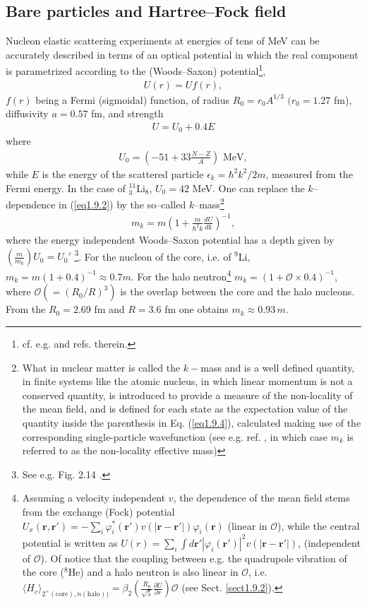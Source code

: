 \subsection{Bare particles and Hartree--Fock field}
Nucleon elastic scattering experiments at energies of tens of MeV can be accurately described in terms of an optical potential in which the real component is parametrized according to the (Woods--Saxon) potential\footnote{cf. e.g. \cite{Bohr:69} and refs. therein.},
\begin{align}
U(r)=Uf(r),
\end{align}
$f(r)$ being a Fermi (sigmoidal) function, of radius $R_0=r_0A^{1/3}$ $(r_0=1.27$ fm), diffusivity $a=0.57$ fm, and strength 
\begin{align}\label{eq1.9.2}
U=U_0+0.4 E
\end{align}
where 
\begin{align}\label{eq1.9.3}
U_0=\left(-51+33\frac{N-Z}{A}\right)\text{ MeV},
\end{align}
while $E$ is the energy of the scattered particle $\epsilon_k=\hbar^2k^2/2m$, measured from the Fermi energy. In the case of $^{11}_3$Li$_8$, $U_0=42$ MeV. One can replace the $k$--dependence in (\ref{eq1.9.2}) by the so--called $k$--mass\footnote{What in nuclear matter is called the $k-$mass  and is a well defined quantity, in finite systems like the atomic nucleus, in which linear momentum is not
a conserved quantity,  is introduced to provide a measure of the non-locality of the mean field, and is defined for each state 
as the expectation value of the quantity inside the parenthesis in Eq. (\ref{eq1.9.4}), calculated making use of the corresponding single-particle wavefunction 
(see e.g. ref. \cite{Bernard:81}, in which case $m_k$ is referred to as the non-locality effective mass)}
\begin{align}\label{eq1.9.4}
m_k=m\left(1+\frac{m}{\hbar^2k}\frac{dU}{dk}\right)^{-1},
\end{align}
where the energy independent Woods--Saxon potential has a depth given by\\\mbox{$\left(\frac{m}{m_k}\right)U_0=U_0'$} \footnote{See e.g. Fig. 2.14 \cite{Mahaux:85}.}. For the nucleon of the core, i.e. of $^9$Li, $m_k=m(1+0.4)^{-1}\approx 0.7 m$. For the halo neutron\footnote{Assuming a velocity independent $v$, the dependence of the mean field stems from the exchange (Fock)  potential $U_x(\mathbf r, \mathbf r')=-\sum_i\varphi^*_i(\mathbf r')v(|\mathbf r-\mathbf r'|)\varphi_i(\mathbf r)$ (linear in $\mathscr O$), while the central potential is written as $U(r)=\sum_i\int d\mathbf r' |\varphi_i(\mathbf r')|^2v(|\mathbf r- \mathbf r'|)$, (independent of $\mathscr O$). Of notice that the coupling between e.g. the quadrupole vibration of the core ($^8$He) and a halo neutron is also linear in $\mathscr O$, i.e. $\langle H_c\rangle_{2^+(\text{core}),n (\text{halo}))}=\beta_2\left(\frac{R_0}{\sqrt{5}}\frac{\partial U}{\partial r}\right)\mathscr O$ (see Sect. \ref{sect1.9.2}).} $m_k=(1+\mathcal O\times0.4)^{-1}$, where $\mathscr O(=(R_0/R)^3)$ is the overlap between the core and the halo nucleons. From the $R_0=2.69$ fm and $R=3.6$ fm one obtains $m_k\approx 0.93 \,m$.
